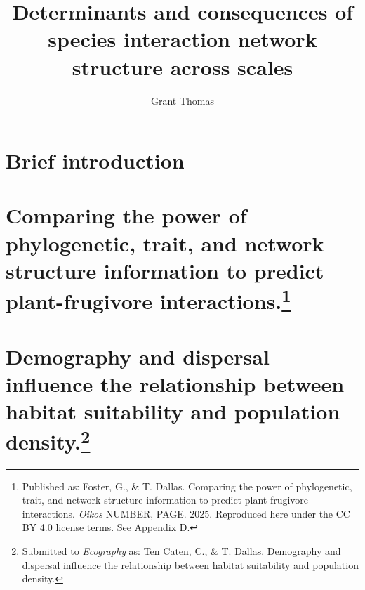 \documentclass{uscthesis}
\title{Determinants and consequences of species interaction network structure across scales \vspace{-2.5ex}}
\author{Grant Thomas}{Foster}    %
\begin{document}
\tableofcontents
\chapter{Brief introduction}    %
\chapter[Comparing the power of phylogenetic, trait, and network structure information to predict plant-frugivore interactions]{Comparing the power of phylogenetic, trait, and network structure information to predict plant-frugivore interactions.\footnote{Published as: Foster, G., \& T. Dallas. Comparing the power of phylogenetic, trait, and network structure information to predict plant-frugivore interactions. \textit{Oikos} NUMBER, PAGE. 2025. Reproduced here under the CC BY 4.0 license terms. See Appendix D.}}    %




\chapter[Demography and dispersal influence the relationship between habitat suitability and population density.]{Demography and dispersal influence the relationship between habitat suitability and population density.\footnote[2]{Submitted to \textit{Ecography} as: Ten Caten, C., \& T. Dallas. Demography and dispersal influence the relationship between habitat suitability and population density.}}




\end{document}
